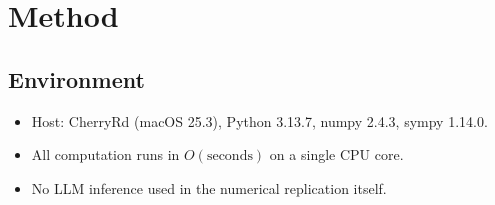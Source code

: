 \documentclass[11pt]{article}
\begin{document}
\section{Method}
\label{sec:method}

\subsection{Environment}
\begin{itemize}
  \item Host: CherryRd (macOS 25.3), Python 3.13.7, numpy 2.4.3, sympy 1.14.0.
  \item All computation runs in $O(\text{seconds})$ on a single CPU core.
  \item No LLM inference used in the numerical replication itself.
\end{itemize}
\end{document}
